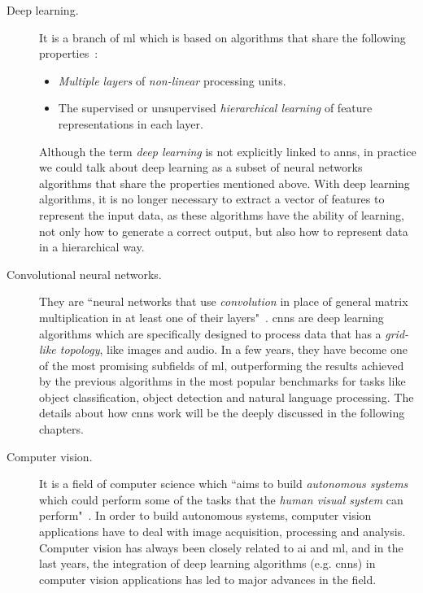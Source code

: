 \begin{description}
	\item[Deep learning.] It is a branch of \gls{ml} which is based on algorithms that share the following properties~\cite{deep-learning-methods-and-applications}:
	\begin{itemize}
		\item \emph{Multiple layers} of \emph{non-linear} processing units.
		\item The supervised or unsupervised \emph{hierarchical learning} of feature representations in each layer.
	\end{itemize}
	
	Although the term \textit{deep learning} is not explicitly linked to \glspl{ann}, in practice we could talk about deep learning as a subset of neural networks algorithms that share the properties mentioned above. With deep learning algorithms, it is no longer necessary to extract a vector of features to represent the input data, as these algorithms have the ability of learning, not only how to generate a correct output, but also how to represent data in a hierarchical way.
\end{description}
\begin{description}
	\item[Convolutional neural networks.] They are ``neural networks that use \emph{convolution} in place of general matrix multiplication in at least one of their layers"~\cite{Goodfellow-et-al-2016}. \glspl{cnn} are deep learning algorithms which are specifically designed to process data that has a \emph{grid-like topology}, like images and audio. In a few years, they have become one of the most promising subfields of \gls{ml}, outperforming the results achieved by the previous algorithms in the most popular benchmarks for tasks like object classification, object detection and natural language processing. The details about how \glspl{cnn} work will be the deeply discussed in the following chapters.
\end{description}

\begin{description}
	\item[Computer vision.] It is a field of computer science which ``aims to build \emph{autonomous systems} which could perform some of the tasks that the \emph{human visual system} can perform"~\cite{huang1996computer}. In order to build autonomous systems, computer vision applications have to deal with image acquisition, processing and analysis. Computer vision has always been closely related to \gls{ai} and \gls{ml}, and in the last years, the integration of deep learning algorithms (e.g. \glspl{cnn}) in computer vision applications has led to major advances in the field.
\end{description}

